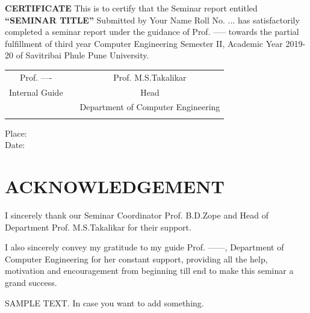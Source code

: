 \documentclass[a4paper, 12pt]{article}
\begin{document}
\begin{titlepage}
\begin{center}
	    \textbf{CERTIFICATE}
	    		\linebreak
	    \linebreak
		This is to certify that the Seminar report entitled
        \linebreak
		\linebreak
		\large
		\textbf{“SEMINAR TITLE”}
		\linebreak
		\linebreak
		Submitted by
		\linebreak
		Your Name \hspace{10mm}   Roll No. ... \linebreak
		\linebreak
		has satisfactorily completed a seminar report under the guidance of Prof. -----  towards the partial fulfillment of third year Computer Engineering Semester II, Academic Year 2019-20 of Savitribai Phule Pune University. 
		\linebreak
		\linebreak
		\linebreak
		\linebreak
		\linebreak
		\begin{table}[h]
		\begin{tabular}{ccc}
		Prof. ----    &                        &  \hspace{52mm} Prof. M.S.Takalikar\\
		Internal Guide      &                     &    \hspace{52mm} Head \\
		          &                         &       \hspace{47mm} Department of Computer Engineering \\
                    &                       & \hspace{52mm} 
		\end{tabular}
		\end{table}
		\end{center}
Place:\\
Date:

\end{titlepage} 

\section*{ACKNOWLEDGEMENT}

\hspace{0.5cm} I sincerely thank our Seminar Coordinator Prof. B.D.Zope and Head of Department Prof. M.S.Takalikar
for their support.
\vspace{0.25cm}
\par I also sincerely convey my gratitude to my guide Prof. ------, Department of Computer Engineering for her constant
support, providing all the help, motivation and encouragement from beginning till end to make this seminar a grand success.
\vspace{0.25cm}
\par SAMPLE TEXT. In case you want to add something.
\end{document}
